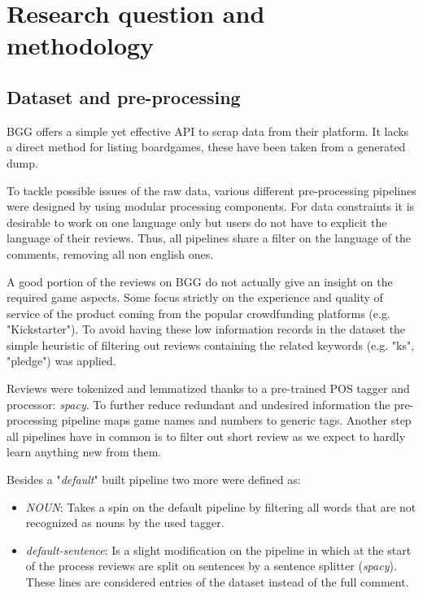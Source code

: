 \section{Research question and methodology}

\subsection{Dataset and pre-processing}
BGG offers a simple yet effective API to scrap data from their platform.
It lacks a direct method for listing boardgames, these have been taken from a generated dump.

To tackle possible issues of the raw data, various different pre-processing pipelines were designed
by using modular processing components.
For data constraints it is desirable to work on one language only but users do not have to explicit the language of their reviews.
Thus, all pipelines share a filter on the language of the comments, removing all non english ones.

A good portion of the reviews on BGG do not actually give an insight on the required game aspects.
Some focus strictly on the experience and quality of service of the product coming from the popular crowdfunding platforms (e.g. "Kickstarter").
To avoid having these low information records in the dataset the simple heuristic of filtering out reviews containing the related keywords (e.g. "ks", "pledge") was applied.

Reviews were tokenized and lemmatized thanks to a pre-trained POS tagger and processor: \textit{spacy}.
To further reduce redundant and undesired information the pre-processing pipeline maps game names and numbers to generic tags.
Another step all pipelines have in common is to filter out short review as we expect to hardly learn anything new from them.

Besides a "\textit{default}" built pipeline two more were defined as:
\begin{itemize}
    \item {\textit{NOUN}}: Takes a spin on the default pipeline by filtering all words that are not recognized as nouns
    by the used tagger. %

    \item {\textit{default-sentence}}: Is a slight modification on the  pipeline in which
    at the start of the process reviews are split on sentences by a sentence splitter (\textit{spacy}).
    These lines are considered entries of the dataset instead of the full comment.
\end{itemize}

